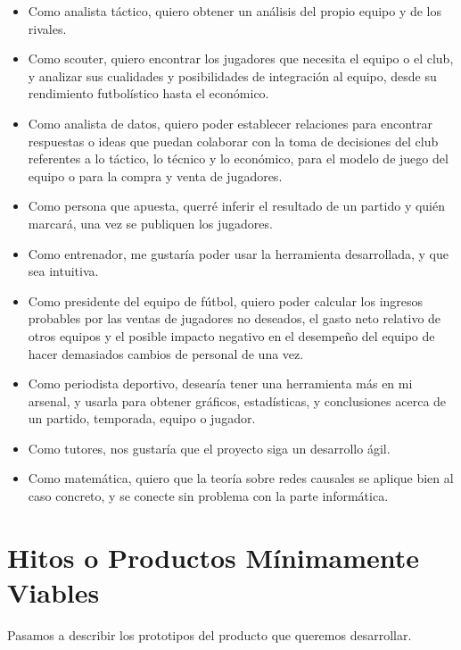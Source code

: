 \begin{itemize}
    \item Como analista táctico, quiero obtener un análisis del propio equipo y de los rivales.
    \item Como scouter,  quiero encontrar los jugadores que necesita el equipo 
    o el club, y analizar sus cualidades y posibilidades de integración al equipo, desde su rendimiento futbolístico hasta el 
    económico.
    \item Como analista de datos, quiero poder establecer relaciones para encontrar respuestas o ideas que 
    puedan colaborar con la toma de decisiones del club referentes 
    a lo táctico, lo técnico y lo económico, para el modelo de 
    juego del equipo o para la compra y venta de jugadores. 
    \item Como persona que apuesta, querré inferir el resultado de un partido y 
    quién marcará, una vez se publiquen los jugadores. 
    \item Como entrenador, me gustaría poder usar la herramienta desarrollada, y que sea intuitiva.
    \item \label{hu:presidente} Como presidente del equipo de fútbol, quiero poder calcular los ingresos 
    probables por las ventas de jugadores no deseados, el gasto neto relativo de otros
    equipos y el posible impacto negativo en el desempeño del equipo de hacer demasiados cambios de personal de una 
    vez.  
    \item Como periodista deportivo, desearía tener una herramienta más en mi arsenal, y 
    usarla para obtener gráficos, estadísticas, y conclusiones acerca de un partido, 
    temporada, equipo o jugador.
    \item Como tutores, nos gustaría que el proyecto siga un desarrollo ágil.
    \item Como matemática, quiero que la teoría sobre redes causales se aplique bien al caso concreto, y 
    se conecte sin problema con la parte informática.
\end{itemize}

\section{Hitos o Productos Mínimamente Viables}
Pasamos a describir los prototipos del producto que queremos desarrollar.

